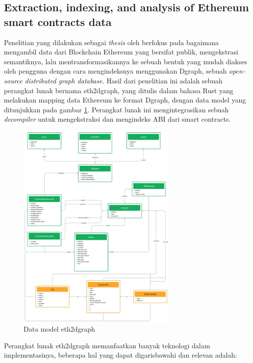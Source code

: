 \subsection{Extraction, indexing, and analysis of Ethereum smart contracts data}
\label{subsec:extraction-indexing-analysis-ethereum-sc}

Penelitian yang dilakukan sebagai \textit{thesis} oleh \cite{aimar2023extraction} berfokus pada bagaimana mengambil data dari Blockchain Ethereum yang bersifat publik, mengekstrasi semantiknya, lalu mentransformasikannya ke sebuah bentuk yang mudah diakses oleh pengguna dengan cara mengindeksnya menggunakan Dgraph, sebuah \textit{open-source distributed graph database}. Hasil dari penelitian ini adalah sebuah perangkat lunak bernama eth2dgraph, yang ditulis dalam bahasa Rust yang melakukan mapping data Ethereum ke format Dgraph, dengan data model yang ditunjukkan pada gambar \ref{image:eth2dgraph-structure}. Perangkat lunak ini mengintegrasikan sebuah \textit{decompiler} untuk mengekstraksi dan mengindeks ABI dari smart contracts.

\begin{figure}
  \centering
  \includegraphics[width=0.7\textwidth]{resources/chapter-2/eth2dgraph-structure.jpg}
  \caption{Data model eth2dgraph \parencite{aimar2023extraction}}
  \label{image:eth2dgraph-structure}
\end{figure}

Perangkat lunak eth2dgraph memanfaatkan banyak teknologi dalam implementasinya, beberapa hal yang dapat digarisbawahi dan relevan adalah:

